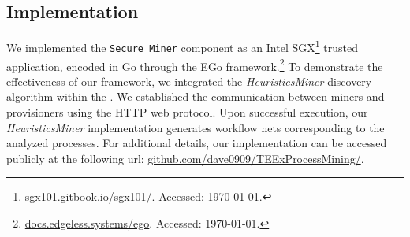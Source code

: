 \subsection{Implementation}
\label{sec:implementation:details}
We implemented the \texttt{Secure Miner} component as an Intel SGX\footnote{\url{sgx101.gitbook.io/sgx101/}. Accessed: \today.} trusted application, encoded in Go through the EGo framework.\footnote{\url{docs.edgeless.systems/ego}. Accessed: \today.} To demonstrate the effectiveness of our framework, we integrated the \textit{HeuristicsMiner} discovery algorithm within the . We established the communication between miners and provisioners using the HTTP web protocol. Upon successful execution, our \textit{HeuristicsMiner} implementation generates workflow nets corresponding to the analyzed processes. For additional details, our implementation can be accessed publicly at the following url: \url{github.com/dave0909/TEExProcessMining/}.
